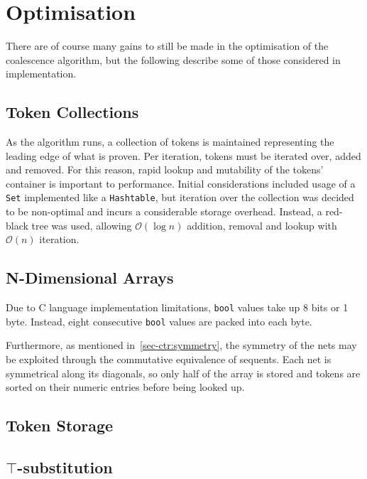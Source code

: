 \section{Optimisation}

    There are of course many gains to still be made in the optimisation of the coalescence algorithm, but the following describe some of those considered in implementation.

    \subsection{Token Collections}
        As the algorithm runs, a collection of tokens is maintained representing the leading edge of what is proven.
        Per iteration, tokens must be iterated over, added and removed.
        For this reason, rapid lookup and mutability of the tokens' container is important to performance.
        Initial considerations included usage of a \texttt{Set} implemented like a \texttt{Hashtable}, but iteration over the collection was decided to be non-optimal and incurs a considerable storage overhead.
        Instead, a red-black tree was used, allowing $\mathcal{O}(\log n)$ addition, removal and lookup with $\mathcal{O}(n)$ iteration.

    \subsection{N-Dimensional Arrays}
        Due to C language implementation limitations, \texttt{bool} values take up 8 bits or 1 byte.
        Instead, eight consecutive \texttt{bool} values are packed into each byte.

        Furthermore, as mentioned in~\ref{sec-ctr:symmetry}, the symmetry of the nets may be exploited through the commutative equivalence of sequents.
        Each net is symmetrical along its diagonals, so only half of the array is stored and tokens are sorted on their numeric entries before being looked up.

    \subsection{Token Storage}

    \subsection{$\top$-substitution}



